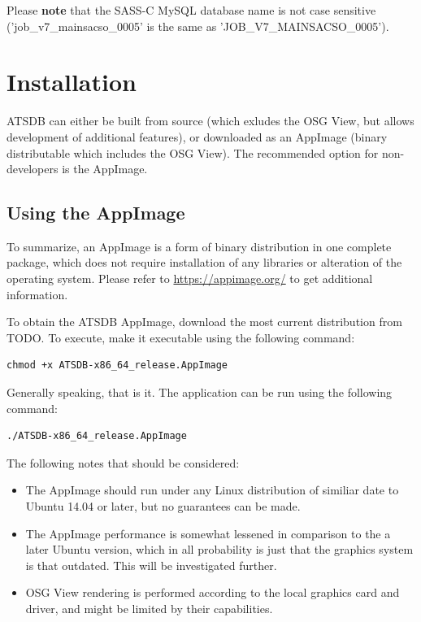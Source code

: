 \documentclass[10pt,letterpaper,extrafontsizes]{memoir}
\begin{document}
Please \textbf{note} that the SASS-C MySQL database name is not case sensitive ('job\_v7\_mainsacso\_0005' is the same as 'JOB\_V7\_MAINSACSO\_0005').

\chapter{Installation}
\label{sec:installation}

ATSDB can either be built from source (which exludes the OSG View, but allows development of additional features), or downloaded as an AppImage (binary distributable which includes the OSG View). The recommended option for non-developers is the AppImage.

\section{Using the AppImage}

To summarize, an AppImage is a form of binary distribution in one complete package, which does not require installation of any libraries or alteration of the operating system. Please refer to \url{https://appimage.org/} to get additional information.

To obtain the ATSDB AppImage, download the most current distribution from TODO. To execute, make it executable using the following command:
\begin{verbatim}
chmod +x ATSDB-x86_64_release.AppImage
\end{verbatim}

Generally speaking, that is it. The application can be run using the following command:
\begin{verbatim}
./ATSDB-x86_64_release.AppImage
\end{verbatim}

The following notes that should be considered:

\begin{itemize}  
\item The AppImage should run under any Linux distribution of similiar date to Ubuntu 14.04 or later, but no guarantees can be made.
\item The AppImage performance is somewhat lessened in comparison to the a later Ubuntu version, which in all probability is just that the graphics system is that outdated. This will be investigated further.
\item OSG View rendering is performed according to the local graphics card and driver, and might be limited by their capabilities.
\end{itemize}
\end{document}
